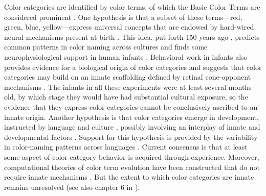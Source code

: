 \documentclass[9pt,biorxiv,lineno,onehalfspacing]{lapreprint}
\begin{document}
\begin{refsection}
Color categories are identified by color terms, of which the Basic Color Terms are considered prominent \citep{berlin_basic_1969}.
One hypothesis is that a subset of these terms---red, green, blue, yellow---express universal concepts \citep{heider_universals_1972,regier_focal_2005}
that are endowed by hard-wired neural mechanisms present at birth \citep{bornstein_categories_1976,lindsey_universality_2006}. 
This idea, put forth 150 years ago \citep{hering_zur_1875}, predicts common patterns in color naming across cultures \citep{baronchelli_modeling_2010,lindsey_hunter-gatherer_2015,abbott_focal_2016}
and finds some neurophysiological support in human infants \citep{clifford_electrophysiological_2009,yang_cortical_2016}. 
Behavioral work in infants also provides evidence for a biological origin of color categories \citep{franklin_new_2004,ozturk_language_2013} and suggests that color categories may build on an innate scaffolding defined by retinal cone-opponent mechanisms \citep{skelton_biological_2017}. 
The infants in all these experiments were at least several months old, by which stage they would have had substantial cultural exposure, so the evidence that they express color categories cannot be conclusively ascribed to an innate origin. 
Another hypothesis is that color categories emerge in development, instructed by language and culture \citep{davidoff_colour_1999,roberson_color_2005}, possibly involving an interplay of innate and developmental factors \citep{webster_variations_2002,kay_language_2006,franklin_lateralization_2008,regier_language_2009,paramei_online_2018}. 
Support for this hypothesis is provided by the variability in color-naming patterns across languages \citep{davidoff_colour_1999,webster_variations_2002,roberson_color_2005,kay_language_2006,gibson_color_2017, paramei_online_2018}. 
Current consensus is that at least some aspect of color category behavior is acquired through experience. Moreover, computational theories of color term evolution have been constructed that do not require innate mechanisms \citep{gibson_color_2017,conway_communication_2020,zaslavsky_efficient_2018,conway_color_2023}.
But the extent to which color categories are innate remains unresolved \citep{davidoff_nature_2009,RN18696,RN18699}(see also chapter 6 in \citep{block_border_2023}). 



\end{refsection}
\end{document}
